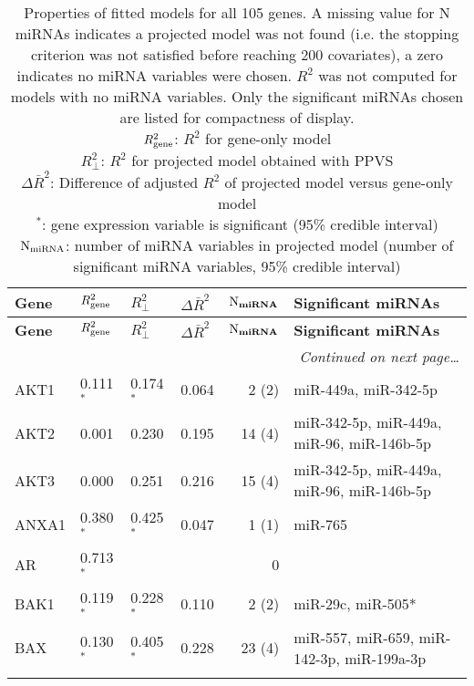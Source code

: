 { %
\footnotesize{\begin{longtable}{llllrp{7cm}}
\caption{
Properties of fitted models for all 105 genes. A missing value for N miRNAs indicates a projected model was not found
(i.e. the stopping criterion was not satisfied before reaching 200 covariates),
a zero indicates no miRNA variables were chosen.
$R^2$ was not computed for models with no miRNA variables.
Only the significant miRNAs chosen are listed for compactness of display. \\
$R^2_{\textup{gene}}$: $R^2$ for gene-only model \\
$R^2_\perp$: $R^2$ for projected model obtained with PPVS \\
$\Delta\bar{R}^2$: Difference of adjusted $R^2$ of projected model versus gene-only model \\
$^{\ast}$: gene expression variable is significant (95\% credible interval) \\
$\textup{N}_{\textup{miRNA}}$: number of miRNA variables in projected model (number of significant miRNA variables, 95\% credible interval) 
\label{table:final-models}
}
\label{table:finalModelTable}\\\hline
\textbf{Gene} & \textbf{$R^2_{\textup{gene}}$} & \textbf{$R^2_\perp$} & \textbf{$\Delta\bar{R}^2$} & $\mathbf{\textup{N}_{miRNA}}$ & \textbf{Significant miRNAs}\\\hline
\endfirsthead{}%
\textbf{Gene} & \textbf{$R^2_{\textup{gene}}$} & \textbf{$R^2_\perp$} & \textbf{$\Delta\bar{R}^2$} & $\mathbf{\textup{N}_{miRNA}}$ & \textbf{Significant miRNAs}\\\hline
\endhead\hline\multicolumn{6}{r}{\textit{Continued on next page\ldots\/}}
\endfoot\hline\endlastfoot{}%
ACACA&0.462$^{\ast}$&0.524$^{\ast}$&0.062&2 (2)&\raggedright{miR-30a, miR-370} \tabularnewline\rowcolor[rgb]{0.96,0.96,0.96}{}%
AKT1&0.111$^{\ast}$&0.174$^{\ast}$&0.064&2 (2)&\raggedright{miR-449a, miR-342-5p} \tabularnewline{}%
AKT2&0.001&0.230&0.195&14 (4)&\raggedright{miR-342-5p, miR-449a, miR-96, miR-146b-5p} \tabularnewline\rowcolor[rgb]{0.96,0.96,0.96}{}%
AKT3&0.000&0.251&0.216&15 (4)&\raggedright{miR-342-5p, miR-449a, miR-96, miR-146b-5p} \tabularnewline{}%
ANXA1&0.380$^{\ast}$&0.425$^{\ast}$&0.047&1 (1)&\raggedright{miR-765} \tabularnewline\rowcolor[rgb]{0.96,0.96,0.96}{}%
AR&0.713$^{\ast}$&&&0&\raggedright{} \tabularnewline{}%
BAK1&0.119$^{\ast}$&0.228$^{\ast}$&0.110&2 (2)&\raggedright{miR-29c, miR-505*} \tabularnewline\rowcolor[rgb]{0.96,0.96,0.96}{}%
BAX&0.130$^{\ast}$&0.405$^{\ast}$&0.228&23 (4)&\raggedright{miR-557, miR-659, miR-142-3p, miR-199a-3p} \tabularnewline{}%

\end{longtable}}}
